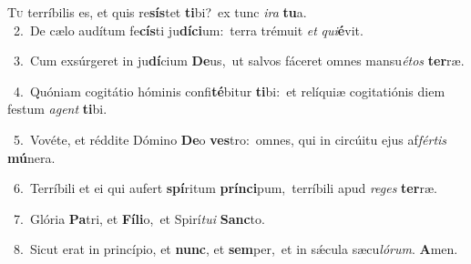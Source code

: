 \lettrine{\initial\textcolor{\initialcolor}{T}}{u} terríbilis es, et quis re\-\textbf{sís}\-tet \textbf{ti}\-bi?~\star ex tunc \textit{i}\-\textit{ra} \textbf{tu}\-a.\\
{\numbfont\textcolor{\numbcolor}{~2.}}~De cælo audítum fe\-\textbf{cís}\-ti ju\-\textbf{dí}\-\textbf{ci}um:~\star terra trémuit \textit{et} \textit{qui}\-\textbf{é}vit.\par
{\numbfont\textcolor{\numbcolor}{~3.}}~Cum exsúrgeret in ju\-\textbf{dí}\-cium \textbf{De}\-us,~\star ut salvos fáceret omnes mansu\-\textit{é}\-\textit{tos} \textbf{ter}\-ræ.\par
{\numbfont\textcolor{\numbcolor}{~4.}}~Quóniam cogitátio hóminis confi\-\textbf{té}\-bitur \textbf{ti}\-bi:~\star et relíquiæ cogitatiónis diem festum \textit{a}\-\textit{gent} \textbf{ti}\-bi.\par
{\numbfont\textcolor{\numbcolor}{~5.}}~Vovéte, et réddite Dómino \textbf{De}\-o \textbf{ves}\-tro:~\star omnes, qui in circúitu ejus af\-\textit{fér}\-\textit{tis} \textbf{mú}\-nera.\par
{\numbfont\textcolor{\numbcolor}{~6.}}~Terríbili et ei qui aufert \textbf{spí}\-ritum \textbf{prín}\-\textbf{ci}pum,~\star terríbili apud \textit{re}\-\textit{ges} \textbf{ter}\-ræ.\par
{\numbfont\textcolor{\numbcolor}{~7.}}~Glória \textbf{Pa}\-tri, et \textbf{Fí}\-\textbf{li}o,~\star et Spirí\-\textit{tu}\-\textit{i} \textbf{Sanc}\-to.\par
{\numbfont\textcolor{\numbcolor}{~8.}}~Sicut erat in princípio, et \textbf{nunc}\-, et \textbf{sem}\-per,~\star et in sǽcula sæcu\-\textit{ló}\-\textit{rum}. \textbf{A}\-men.\par
